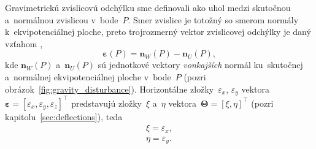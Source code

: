 \documentclass[a4paper, 12pt]{book}
\let\vec\mathbf
\begin{document}
Gravimetrickú zvislicovú odchýlku sme definovali ako uhol medzi skutočnou 
a~normálnou zvislicou v~bode~$P$.  Smer zvislice je totožný so smerom normály 
k~ekvipotenciálnej ploche, preto trojrozmerný vektor zvislicovej odchýlky je 
daný vzťahom \parencite{SansoGeoidDetermination},
%
\begin{equation}
\label{eq:deflection_eps}
\boldsymbol\varepsilon(P) = \vec n_W(P) - \vec n_U(P){,}
\end{equation}
%
kde $\vec n_W(P)$ a~$\vec n_U(P)$ sú jednotkové vektory \emph{vonkajších} 
normál ku~skutočnej a~normálnej ekvipotenciálnej ploche v~bode~$P$ (pozri 
obrázok~\ref{fig:gravity_disturbance}).  Horizontálne zložky~$\varepsilon_x$, 
$\varepsilon_y$ vektora~$\boldsymbol\varepsilon = [\varepsilon_x, 
\varepsilon_y, \varepsilon_z]^\top$ predstavujú zložky~$\xi$ a~$\eta$ 
vektora~$\boldsymbol\Theta = [\xi, \eta]^\top$ (pozri 
kapitolu~\ref{sec:deflections}), teda
%
\begin{equation}
\label{eq:xi_eta_eps}
\begin{split}
\xi = \varepsilon_x{,}\\
\eta = \varepsilon_y{.}
\end{split}
\end{equation}
\end{document}
